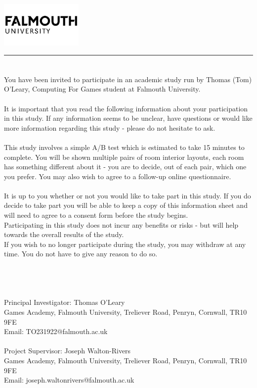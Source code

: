 \documentclass{article}
\begin{document}
\includegraphics[width=0.3\textwidth]{falmouth-university-vector-logo.png} %
\vspace{-1em} %

\rule{\linewidth}{1pt} %
\bigskip %

\section*{}

You have been invited to participate in an academic study run by Thomas (Tom) O’Leary, Computing For Games student at Falmouth University.
\\
\\
It is important that you read the following information about your participation in this study. If any information seems to be unclear, have questions or would like more information regarding this study - please do not hesitate to ask.
\\
\\
This study involves a simple A/B test which is estimated to take 15 minutes to complete. You will be shown multiple pairs of room interior layouts, each room has something different about it - you are to decide, out of each pair, which one you prefer. You may also wish to agree to a follow-up online questionnaire.
\\
\\
It is up to you whether or not you would like to take part in this study. If you do decide to take part you will be able to keep a copy of this information sheet and will need to agree to a consent form before the study begins.
\\
Participating in this study does not incur any benefits or risks - but will help towards the overall results of the study.
\\
If you wish to no longer participate during the study, you may withdraw at any time. You do not have to give any reason to do so.
\\
\\
\\
\section*{}
Principal Investigator: Thomas O’Leary
\\
Games Academy, Falmouth University, Treliever Road, Penryn, Cornwall, TR10 9FE
\\
Email: TO231922@falmouth.ac.uk
\\
\\
Project Supervisor: Joseph Walton-Rivers
\\
Games Academy, Falmouth University, Treliever Road, Penryn, Cornwall, TR10 9FE
\\
Email: joseph.waltonrivers@falmouth.ac.uk
\end{document}
